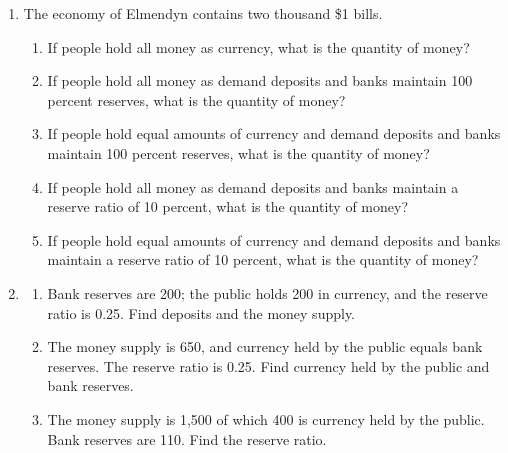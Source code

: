 \documentclass{article}
\begin{document}
\begin{enumerate}
\begin{enumerate}
	\item What quantity of bonds does the Fed need to buy or sell to accomplish the goal? Explain your reasoning.
	
	\end{enumerate}
	
\item The economy of Elmendyn contains two thousand \$1 bills. 

	\begin{enumerate}
	
	\item If people hold all money as currency, what is the quantity of money?
	
	\item If people hold all money as demand deposits and banks maintain 100 percent reserves, what is the quantity of money? 
	
	\item If people hold equal amounts of currency and demand deposits and banks maintain 100 percent reserves, what is the quantity of money?
	
	\item If people hold all money as demand deposits and banks maintain a reserve ratio of 10 percent, what is the quantity of money?
	
	\item If people hold equal amounts of currency and demand deposits and banks maintain a reserve ratio of 10 percent, what is the quantity of money?
	
	\end{enumerate}
		
\item

	\begin{enumerate}
	
	\item Bank reserves are 200; the public holds 200 in currency, and the reserve ratio is 0.25. Find deposits and the money supply.
	
	\item The money supply is 650, and currency held by the public equals bank reserves. The reserve ratio is 0.25. Find currency held by the public and bank reserves.
	
	\item The money supply is 1,500 of which 400 is currency held by the public. Bank reserves are 110. Find the reserve ratio. 
	
	\end{enumerate}

\end{enumerate}
\end{document}
